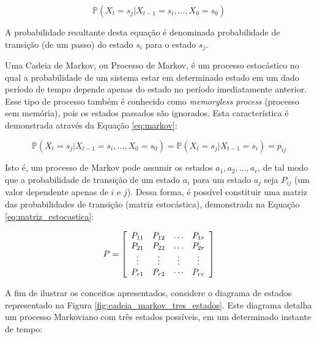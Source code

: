 \documentclass[msc, classic, a4paper]{ufbathesis}
\begin{document}
\begin{equation}
    \label{eq:prob_proc_estoc}
    \mathbb { P } \left( X _ { t } = s _ { j } | X _ { t - 1 } = s _ { i } , \ldots , X _ { 0 } = s _ { 0 } \right)
\end{equation}

A probabilidade resultante desta equação é denominada probabilidade de transição (de um passo) do estado $s_i$ para o estado $s_j$.

Uma Cadeia de Markov, ou Processo de Markov,
é um processo estocástico no qual a probabilidade de um sistema estar em determinado estado em um dado período de tempo depende apenas do estado no período imediatamente anterior.
Esse tipo de processo também é conhecido como \textit{memoryless process} (processo sem memória), pois os estados passados são ignorados.
Esta característica é demonstrada através da Equação \ref{eq:markov}:

\begin{equation}
    \label{eq:markov}
    \mathbb { P } \left( X _ { t } = s _ { j } | X _ { t - 1 } = s _ { i } , \ldots , X _ { 0 } = s _ { 0 } \right) = \mathbb { P } \left( X _ { t } = s _ { j } | X _ { t - 1 } = s _ { i } \right) = p _ { i j }
\end{equation}

Isto é, um processo de Markov pode assumir os estados $a_1, a_2, \ldots, a_r$, de tal modo que a probabilidade
de transição de um estado $a_i$ para um estado $a_j$ seja $P_{ij}$ (um valor dependente apenas de $i$ e $j$).
Dessa forma, é possível constituir uma matriz das probabilidades de transição (matriz estocástica),
demonstrada na Equação \ref{eq:matriz_estocastica}:

\begin{equation}
\label{eq:matriz_estocastica}
P = \left[ \begin{array} { c c c c } { P _ { 11 } } & { P _ { 12 } } & { \dots } & { P _ { 1 r } } \\ { P _ { 21 } } & { P _ { 22 } } & { \dots } & { P _ { 2 r } } \\ { \vdots } & { \vdots } & { \vdots } & { \vdots } \\ { P _ { r 1 } } & { P _ { r 2 } } & { \cdots } & { P _ { r r } } \end{array} \right]
\end{equation}

A fim de ilustrar os conceitos apresentados, considere o diagrama de estados representado na Figura \ref{fig:cadeia_markov_tres_estados}.
Este diagrama detalha um processo Markoviano com três estados possíveis, em um determinado instante de tempo:
\end{document}
